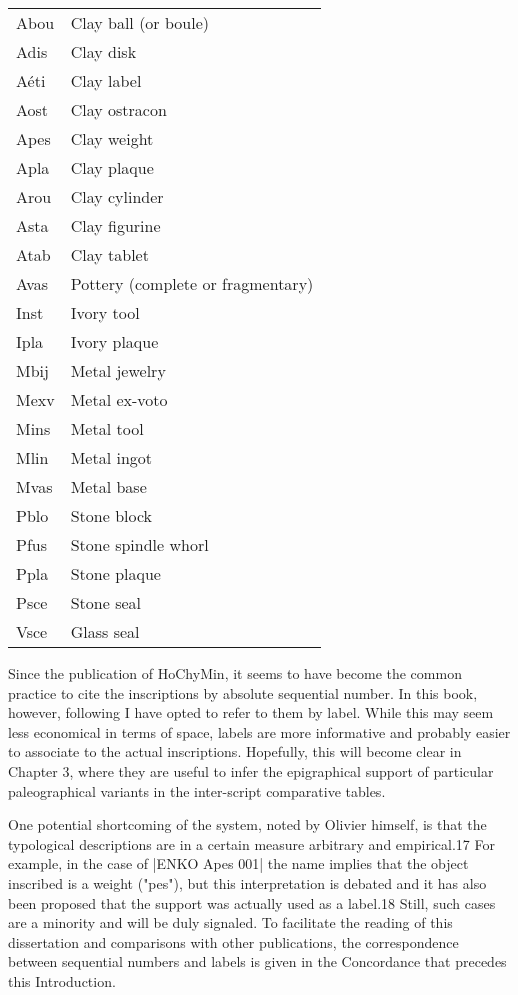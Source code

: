 \begin{longtable}[l]{>{\ttfamily}ll}
Abou & Clay ball (or boule)\\
Adis & Clay disk\\
Aéti & Clay label\\
Aost & Clay ostracon\\
Apes & Clay weight\\
Apla & Clay plaque\\
Arou & Clay cylinder\\
Asta & Clay figurine\\
Atab & Clay tablet\\
Avas & Pottery (complete or fragmentary)\\
Inst & Ivory tool\\
Ipla & Ivory plaque\\
Mbij & Metal jewelry\\
Mexv & Metal ex-voto\\
Mins & Metal tool\\
Mlin & Metal ingot\\
Mvas & Metal base\\
Pblo & Stone block\\
Pfus & Stone spindle whorl\\
Ppla & Stone plaque\\
Psce & Stone seal\\
Vsce & Glass seal\\
\end{longtable}


Since the publication of HoChyMin, it seems to have become the common
practice to cite the inscriptions by absolute sequential number. In this book, however, following I have 
opted to refer to them by label. While this may seem less economical in terms of space,
labels are more informative and probably easier to associate to the actual inscriptions.
Hopefully, this will become clear in Chapter 3, where they are useful to infer the
epigraphical support of particular paleographical variants in the inter-script comparative
tables.

One potential shortcoming of the system, noted by Olivier himself, is that the
typological descriptions are in a certain measure arbitrary and empirical.17 For example,
in the case of |ENKO Apes 001| the name implies that the object inscribed is a weight
("pes"), but this interpretation is debated and it has also been proposed that the support
was actually used as a label.18 Still, such cases are a minority and will be duly signaled.
To facilitate the reading of this dissertation and comparisons with other publications, the
correspondence between sequential numbers and labels is given in the Concordance that
precedes this Introduction.

